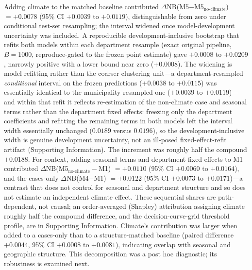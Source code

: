 \documentclass[11pt,a4paper]{article}
\begin{document}
Adding climate to the matched baseline contributed $\Delta$NB(M5$-$M5$_{\text{no-climate}}$) $=+0.0078$ (95\% CI $+0.0039$ to $+0.0119$), distinguishable from zero under conditional test-set resampling; the interval widened once model-development uncertainty was included. A reproducible development-inclusive bootstrap that refits both models within each department resample (exact original pipeline, $B=1000$, reproduce-gated to the frozen point estimate) gave $+0.0008$ to $+0.0209$, narrowly positive with a lower bound near zero ($+0.0008$). The widening is model refitting rather than the coarser clustering unit---a department-resampled \emph{conditional} interval on the frozen predictions ($+0.0038$ to $+0.0115$) was essentially identical to the municipality-resampled one ($+0.0039$ to $+0.0119$)---and within that refit it reflects re-estimation of the non-climate case and seasonal terms rather than the department fixed effects: freezing only the department coefficients and refitting the remaining terms in both models left the interval width essentially unchanged ($0.0189$ versus $0.0196$), so the development-inclusive width is genuine development uncertainty, not an ill-posed fixed-effect-refit artifact (Supporting Information). The increment was roughly half the compound $+0.0188$. For context, adding seasonal terms and department fixed effects to M1 contributed $\Delta$NB(M5$_{\text{no-climate}}-$M1) $=+0.0110$ (95\% CI $+0.0060$ to $+0.0164$), and the cases-only $\Delta$NB(M4$-$M1) $=+0.0122$ (95\% CI $+0.0073$ to $+0.0171$)---a contrast that does not control for seasonal and department structure and so does not estimate an independent climate effect. These sequential shares are path-dependent, not causal; an order-averaged (Shapley) attribution assigning climate roughly half the compound difference, and the decision-curve-grid threshold profile, are in Supporting Information. Climate's contribution was larger when added to a cases-only than to a structure-matched baseline (paired difference $+0.0044$, 95\% CI $+0.0008$ to $+0.0081$), indicating overlap with seasonal and geographic structure. This decomposition was a post hoc diagnostic; its robustness is examined next.
\end{document}
